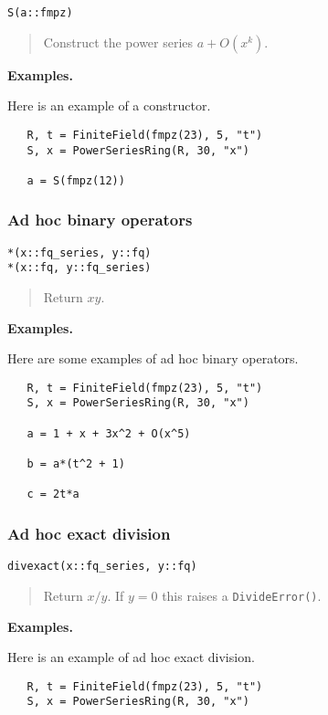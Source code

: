 \documentclass[a4paper,10pt]{article}
\newcommand{\code}{\lstinline}
\newcommand{\desc}[1]{\vspace{-3mm}\begin{quote}#1\end{quote}}
\begin{document}
{{\begin{lstlisting}
S(a::fmpz)
\end{lstlisting}

\desc{Construct the power series $a + O(x^k)$.}

\textbf{Examples.}

Here is an example of a constructor.

\begin{lstlisting}
   R, t = FiniteField(fmpz(23), 5, "t")
   S, x = PowerSeriesRing(R, 30, "x")

   a = S(fmpz(12))
\end{lstlisting}

\subsubsection{Ad hoc binary operators}

\begin{lstlisting}
*(x::fq_series, y::fq)
*(x::fq, y::fq_series)
\end{lstlisting}

\desc{Return $xy$.}

\textbf{Examples.}

Here are some examples of ad hoc binary operators.

\begin{lstlisting}
   R, t = FiniteField(fmpz(23), 5, "t")
   S, x = PowerSeriesRing(R, 30, "x")

   a = 1 + x + 3x^2 + O(x^5)
   
   b = a*(t^2 + 1)

   c = 2t*a
\end{lstlisting}

\subsubsection{Ad hoc exact division}

\begin{lstlisting}
divexact(x::fq_series, y::fq)
\end{lstlisting}

\desc{Return $x/y$. If $y = 0$ this raises a \code{DivideError()}.}

\textbf{Examples.}

Here is an example of ad hoc exact division.

\begin{lstlisting}
   R, t = FiniteField(fmpz(23), 5, "t")
   S, x = PowerSeriesRing(R, 30, "x")


\end{lstlisting}}}
\end{document}
